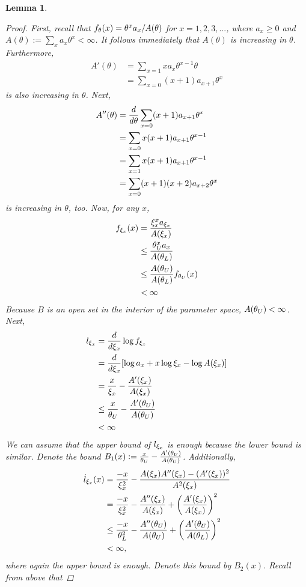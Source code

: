 \documentclass[11 pt]{article}
\newtheorem{lem}{Lemma}
\renewcommand{\th}{\theta}
\begin{document}
\begin{lem}
\begin{proof}
First, recall that $\fth = \th^x a_x / A(\th)$ for $x = 1,2,3,...$, where $a_x \geq 0$ and $A(\th) := \sum_x a_x\th^x < \infty$. It follows immediately that $A(\th)$ is increasing in $\th$. Furthermore, 
\begin{align*}
 A'(\th) &= \sum_{x=1} xa_x \th^{x-1} \th \\
&= \sum_{x=0} (x+1) a_{x+1} \th^x
\end{align*}
is also increasing in $\th$. Next,
\begin{align*}
A''(\th) &= \dth \sum_{x=0} (x+1) a_{x+1} \th^x \\
&= \sum_{x=0} x(x+1)a_{x+1}\th^{x-1} \\
&= \sum_{x=1} x(x+1)a_{x+1}\th^{x-1} \\
&= \sum_{x=0} (x+1)(x+2)a_{x+2}\th^{x} 
\end{align*}
is increasing in $\th$, too. Now, for any $x$,
\begin{align*}
f_{\xi_x}(x) &= \frac{\xi_x^x a_{\xi_x}}{A(\xi_x)} \\
&\leq \frac{\theta_U^x a_{x}}{A(\theta_L)} \\
&\leq \frac{A(\theta_U)}{A(\theta_L)}f_{\theta_U}(x) \\
&< \infty
\end{align*}
Because $B$ is an open set in the interior of the parameter space, $A(\theta_U) < \infty$.  Next,
\begin{align*}
l_{\xi_x}  &= \frac{d}{d \xi_x} \log f_{\xi_x} \\
&= \frac{d}{d \xi_x} [\log a_x  + x\log \xi_x- \log A(\xi_x) ] \\
&= \frac{x}{\xi_x} - \frac{A'(\xi_x)}{A(\xi_x)} \\
&\leq \frac{x}{\theta_U} - \frac{A'(\theta_U)}{A(\theta_U)} \\
&< \infty
\end{align*}
We can assume that the upper bound of $l_{\xi_x}$ is enough because the lower bound is similar. Denote the bound $B_1(x) := \frac{x}{\theta_U} - \frac{A'(\theta_U)}{A(\theta_U)}$. Additionally,
\begin{align*}
\dot{l}_{\xi_x} (x) &= \frac{-x}{\xi_x^2} - \frac{A(\xi_x)A''(\xi_x) - (A'(\xi_x))^2}{A^2(\xi_x)} \\
&= \frac{-x}{\xi_x^2} - \frac{A''(\xi_x)}{A(\xi_x)} + \left (\frac{A'(\xi_x)}{A(\xi_x)} \right )^2 \\
&\leq \frac{-x}{\theta_L^2} - \frac{A''(\theta_U)}{A(\theta_U)} + \left (\frac{A'(\theta_U)}{A(\theta_L)} \right )^2 \\
&< \infty,
\end{align*}
where again the upper bound is enough. Denote this bound by $B_2(x)$. Recall from above that 


\end{proof}
\end{lem}
\end{document}
